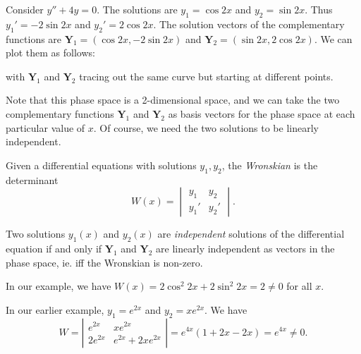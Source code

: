 \documentclass[a4paper]{article}
\begin{document}
\begin{eg}
  Consider $y'' + 4y = 0$. The solutions are $y_1 = \cos 2x$ and $y_2 = \sin 2x$. Thus $y_1' = -2\sin 2x$ and $y_2' = 2\cos 2x$. The solution vectors of the complementary functions are $\mathbf{Y}_1 = (\cos 2x, -2\sin 2x)$ and $\mathbf{Y}_2 = (\sin 2x, 2\cos 2x)$. We can plot them as follows:
  \begin{center}
  \end{center}
  with $\mathbf{Y}_1$ and $\mathbf{Y}_2$ tracing out the same curve but starting at different points.
\end{eg}

Note that this phase space is a 2-dimensional space, and we can take the two complementary functions $\mathbf{Y}_1$ and $\mathbf{Y}_2$ as basis vectors for the phase space at each particular value of $x$. Of course, we need the two solutions to be linearly independent.

\begin{defi}[Wronskian]
  Given a differential equations with solutions $y_1, y_2$, the \emph{Wronskian} is the determinant
  \[
    W(x) = \begin{vmatrix}y_1 & y_2 \\ y_1' & y_2'\end{vmatrix}.
  \]
\end{defi}
\begin{defi}
  Two solutions $y_1(x)$ and $y_2(x)$ are \emph{independent} solutions of the differential equation if and only if $\mathbf{Y}_1$  and $\mathbf{Y}_2$  are linearly independent as vectors in the phase space, ie. iff the Wronskian is non-zero.
\end{defi}

In our example, we have $W(x) = 2\cos^2 2x + 2\sin^2 2x = 2 \not= 0$ for all $x$.

\begin{eg}
  In our earlier example, $y_1 = e^{2x}$ and $y_2 = xe^{2x}$. We have
  \[
    W = \left|\begin{matrix} e^{2x} & xe^{2x}\\ 2e^{2x} & e^{2x} + 2xe^{2x} \end{matrix}\right| = e^{4x}(1 + 2x - 2x) = e^{4x} \not= 0.
  \]
\end{eg}
\end{document}
